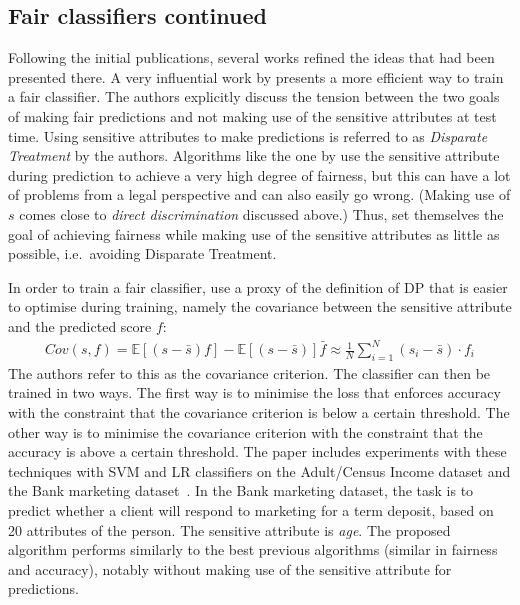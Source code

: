 \subsection{Fair classifiers continued}
Following the initial publications,
several works refined the ideas that had been presented there.
A very influential work by \citet{zafar2017fairnessconstraints}
presents a more efficient way to train a fair classifier.
The authors explicitly discuss the tension
between the two goals of making fair predictions and not making use of the sensitive attributes at test time.
Using sensitive attributes to make predictions
is referred to as \emph{Disparate Treatment} by the authors.
Algorithms like the one by \citet{calders2009building} use the sensitive
attribute during prediction to achieve a very high degree of fairness, but this can have a
lot of problems from a legal perspective and can also easily go wrong.
(Making use of \(s\) comes close to \emph{direct discrimination} discussed above.)
Thus, \citet{zafar2017fairnessconstraints} set themselves the goal of achieving fairness while making use of the sensitive attributes
as little as possible, i.e.~avoiding Disparate Treatment.

In order to train a fair classifier, \citet{zafar2017fairnessconstraints} use a proxy of the definition of
\ac{DP} that is easier to optimise during training, namely the covariance
between the sensitive attribute and the predicted score \(f\):
\begin{align}
  \label{eq:zafar-constraint}
  Cov(s, f) = \mathbb{E}[(s - \bar{s})f] - \mathbb{E}[(s - \bar{s})]\bar{f} \approx 
  \frac{1}{N} \sum\limits_{i=1}^{N} (s_i - \bar{s}) \cdot f_i
\end{align}
The authors refer to this as the covariance criterion.
The classifier can then be trained in two ways.
The first way is to minimise the loss that enforces accuracy
with the constraint that the covariance criterion is below a certain threshold.
The other way is to minimise the covariance criterion
with the constraint that the accuracy is above a certain threshold.
The paper includes experiments with these techniques with \ac{SVM} and \acf{LR} classifiers
on the Adult/Census Income dataset and the Bank marketing dataset~\citep{Dua:2017}.
In the Bank marketing dataset, the task is to predict whether a client will respond to marketing for a term deposit,
based on 20 attributes of the person.
The sensitive attribute is \emph{age}.
The proposed algorithm performs similarly to the best previous algorithms (similar in fairness and accuracy),
notably without making use of the sensitive attribute for predictions.

